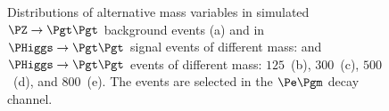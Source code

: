{{{{{\begin{figure}
\begin{center}
\end{center}
\caption{
  Distributions of alternative mass variables in simulated $\PZ \to \Pgt\Pgt$ background events (a) 
  and in $\PHiggs \to \Pgt\Pgt$ signal events of different mass:
  and $\PHiggs \to \Pgt\Pgt$ events of different mass:
  $125$~\GeV (b), $300$~\GeV (c), $500$~\GeV (d), and $800$~\GeV (e).
  The events are selected in the $\Pe\Pgm$ decay channel.
}
\label{fig:massDistributions_sm_emu}
\end{figure}

}}}}}
